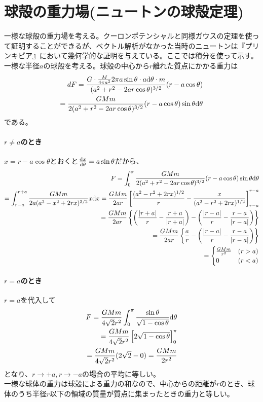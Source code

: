 
\section{球殻の重力場(ニュートンの球殻定理)}
	一様な球殻の重力場を考える。クーロンポテンシャルと同様ガウスの定理を使って証明することができるが、ベクトル解析がなかった当時のニュートンは『プリンキピア』において幾何学的な証明を与えている。ここでは積分を使って示す。
	一様な半径$a$の球殻を考える。球殻の中心から$r$離れた質点にかかる重力は
	\begin{align*}
		dF = \frac{G \cdot \frac{M}{4\pi a^2}2\pi a\sin\theta \cdot a\d\theta \cdot m}{(a^2 + r^2 - 2ar\cos\theta)^{3/2}}(r - a\cos\theta)\\
		= \frac{GMm}{2(a^2 + r^2 - 2ar\cos\theta)^{3/2}}(r - a\cos\theta)\sin\theta\d\theta
	\end{align*}
	である。
	\paragraph{$r \neq a$のとき}
		$x = r - a\cos\theta$とおくと$\de[x]{\theta} = a\sin\theta$だから、
		\begin{align*}
			F = \int_0^\pi \frac{GMm}{2(a^2 + r^2 - 2ar\cos\theta)^{3/2}}(r - a\cos\theta)\sin\theta\d\theta\\
			= \int_{r-a}^{r+a} \frac{GMm}{2a(a^2 - x^2 + 2rx)^{3/2}}x\d x
			= \frac{GMm}{2ar} \llr{ \frac{(a^2 - r^2 + 2rx)^{1/2}}{r} - \frac{x}{(a^2 - r^2 + 2rx)^{1/2}} }_{r-a}^{r-a}\\
			= \frac{GMm}{2ar} \mlr{ \lr{ \frac{|r+a|}{r} - \frac{r+a}{|r+a|} } - \lr{ \frac{|r-a|}{r} - \frac{r-a}{|r-a|} } }\\
			= \frac{GMm}{2ar} \mlr{ \frac{a}{r} - \lr{ \frac{|r-a|}{r} - \frac{r-a}{|r-a|} } }\\
			=
			\begin{cases}
				\frac{GMm}{r^2} & (r > a)\\
				0 & (r < a)
			\end{cases}
		\end{align*}
	\paragraph{$r = a$のとき}
		$r = a$を代入して
		\begin{align*}
			F = \frac{GMm}{4\sqrt{2}r^2} \int_0^\pi \frac{\sin\theta}{\sqrt{1 - \cos\theta}} \d\theta\\
			= \frac{GMm}{4\sqrt{2}r^2} \llr{2\sqrt{1 - \cos\theta}}_0^\pi\\
			= \frac{GMm}{4\sqrt{2}r^2} (2\sqrt{2} - 0) = \frac{GMm}{2r^2}
		\end{align*}
		となり、$r \to +a, r \to -a$の場合の平均に等しい。\\
	一様な球体の重力は球殻による重力の和なので、中心からの距離が$r$のとき、球体のうち半径$r$以下の領域の質量が質点に集まったときの重力と等しい。

